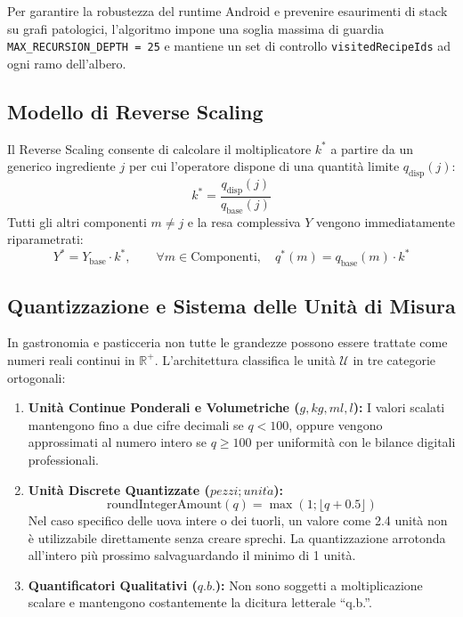 \documentclass[11pt,a4paper,titlepage]{article}
\begin{document}
\begin{archbox}
Per garantire la robustezza del runtime Android e prevenire esaurimenti di stack su grafi patologici, l'algoritmo impone una soglia massima di guardia \texttt{MAX\_RECURSION\_DEPTH = 25} e mantiene un set di controllo \texttt{visitedRecipeIds} ad ogni ramo dell'albero.
\end{archbox}

\subsection{Modello di Reverse Scaling}
Il Reverse Scaling consente di calcolare il moltiplicatore $k^*$ a partire da un generico ingrediente $j$ per cui l'operatore dispone di una quantit\`a limite $q_{\text{disp}}(j)$:
$$k^* = \frac{q_{\text{disp}}(j)}{q_{\text{base}}(j)}$$
Tutti gli altri componenti $m \neq j$ e la resa complessiva $Y$ vengono immediatamente riparametrati:
$$Y^* = Y_{\text{base}} \cdot k^*, \qquad \forall m \in \text{Componenti}, \quad q^*(m) = q_{\text{base}}(m) \cdot k^*$$

\subsection{Quantizzazione e Sistema delle Unit\`a di Misura}
In gastronomia e pasticceria non tutte le grandezze possono essere trattate come numeri reali continui in $\mathbb{R}^+$. L'architettura classifica le unit\`a $\mathcal{U}$ in tre categorie ortogonali:
\begin{enumerate}
    \item \textbf{Unit\`a Continue Ponderali e Volumetriche ($g, kg, ml, l$):} I valori scalati mantengono fino a due cifre decimali se $q < 100$, oppure vengono approssimati al numero intero se $q \ge 100$ per uniformit\`a con le bilance digitali professionali.
    \item \textbf{Unit\`a Discrete Quantizzate ($pezzi; unit\grave{a}$):}
    $$\text{roundIntegerAmount}(q) = \max(1; \lfloor q + 0.5 \rfloor)$$
    Nel caso specifico delle uova intere o dei tuorli, un valore come 2.4 unit\`a non \`e utilizzabile direttamente senza creare sprechi. La quantizzazione arrotonda all'intero pi\`u prossimo salvaguardando il minimo di 1 unit\`a.
    \item \textbf{Quantificatori Qualitativi ($q.b.$):} Non sono soggetti a moltiplicazione scalare e mantengono costantemente la dicitura letterale ``q.b.''.
\end{enumerate}
\end{document}
